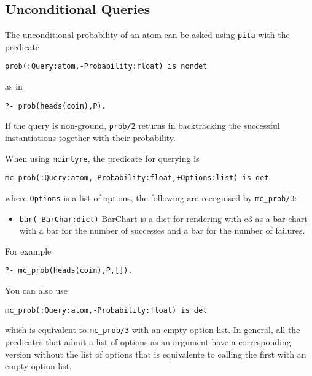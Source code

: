 \subsection{Unconditional Queries}
\label{uncondq}
The unconditional probability of an atom can be asked using \verb|pita| with the predicate
\begin{verbatim}
prob(:Query:atom,-Probability:float) is nondet
\end{verbatim}
as in
\begin{verbatim}
?- prob(heads(coin),P).
\end{verbatim}
If the query is non-ground, \verb|prob/2| returns in backtracking the successful instantiations together with their probability.

When using \verb|mcintyre|, the predicate for querying is
\begin{verbatim}
mc_prob(:Query:atom,-Probability:float,+Options:list) is det
\end{verbatim} where
\verb|Options| is a list of options, the following are recognised by \verb|mc_prob/3|:
\begin{itemize}
\item \verb|bar(-BarChar:dict)|
BarChart is a dict for rendering with c3 as a bar chart with
a bar for the number of successes and a bar for the number
of failures.
\end{itemize}
For example
\begin{verbatim}
?- mc_prob(heads(coin),P,[]).
\end{verbatim}
You can also use
\begin{verbatim}
mc_prob(:Query:atom,-Probability:float) is det
\end{verbatim}
which is equivalent to \verb|mc_prob/3| with an empty option list. In general, all the predicates that admit
a list of options as an argument have a corresponding version without the list of options that is equivalente
to calling the first with an empty option list.

